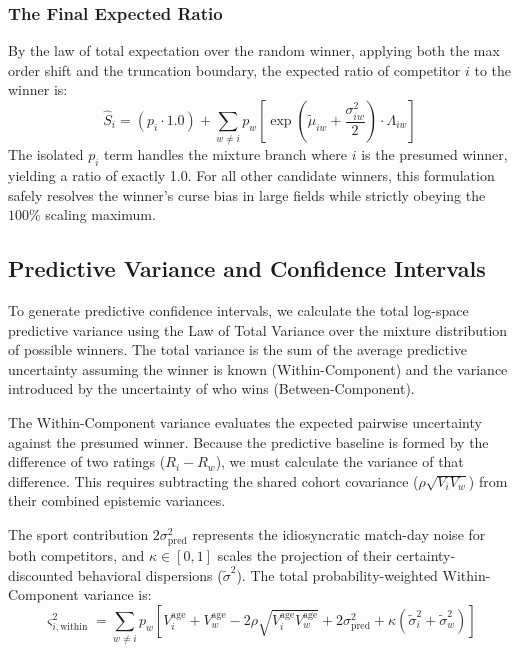 \documentclass[12pt]{article}
\begin{document}
	\subsubsection*{The Final Expected Ratio}
	By the law of total expectation over the random winner, applying both the max order shift and the truncation boundary, the expected ratio of competitor $i$ to the winner is:
	\begin{equation}
		\hat{S}_i = (p_i \cdot 1.0) + \sum_{w \neq i} p_w \left[ \exp\!\left(\tilde{\mu}_{iw} + \frac{\sigma_{iw}^2}{2}\right) \cdot \Lambda_{iw} \right]
	\end{equation}
	The isolated $p_i$ term handles the mixture branch where $i$ is the presumed winner, yielding a ratio of exactly 1.0. For all other candidate winners, this formulation safely resolves the winner's curse bias in large fields while strictly obeying the $100\%$ scaling maximum.

	\subsection{Predictive Variance and Confidence Intervals}
	To generate predictive confidence intervals, we calculate the total log-space predictive variance using the Law of Total Variance over the mixture distribution of possible winners. The total variance is the sum of the average predictive uncertainty assuming the winner is known (Within-Component) and the variance introduced by the uncertainty of who wins (Between-Component).

	The Within-Component variance evaluates the expected pairwise uncertainty against the presumed winner. Because the predictive baseline is formed by the difference of two ratings ($R_i - R_w$), we must calculate the variance of that difference. This requires subtracting the shared cohort covariance ($\rho \sqrt{V_i V_w}$) from their combined epistemic variances.

	The sport contribution $2\sigma_{\mathrm{pred}}^2$ represents the idiosyncratic match-day noise for both competitors, and $\kappa \in [0,1]$ scales the projection of their certainty-discounted behavioral dispersions ($\tilde{\sigma}^2$). The total probability-weighted Within-Component variance is:
	\begin{equation}
		\varsigma_{i,\mathrm{within}}^2 = \sum_{w \neq i} p_w \left[ V_i^{\mathrm{age}} + V_w^{\mathrm{age}} - 2\rho\sqrt{V_i^{\mathrm{age}} V_w^{\mathrm{age}}} + 2\sigma_{\mathrm{pred}}^2 + \kappa(\tilde{\sigma}_i^2 + \tilde{\sigma}_w^2) \right]
	\end{equation}
\end{document}
